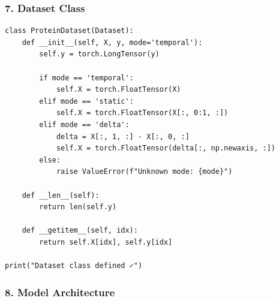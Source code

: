 \subsubsection*{7. Dataset Class}
 
\begin{lstlisting}
class ProteinDataset(Dataset):
    def __init__(self, X, y, mode='temporal'):
        self.y = torch.LongTensor(y)
 
        if mode == 'temporal':
            self.X = torch.FloatTensor(X)
        elif mode == 'static':
            self.X = torch.FloatTensor(X[:, 0:1, :])
        elif mode == 'delta':
            delta = X[:, 1, :] - X[:, 0, :]
            self.X = torch.FloatTensor(delta[:, np.newaxis, :])
        else:
            raise ValueError(f"Unknown mode: {mode}")
 
    def __len__(self):
        return len(self.y)
 
    def __getitem__(self, idx):
        return self.X[idx], self.y[idx]
 
print("Dataset class defined ✓")
\end{lstlisting}
 
\subsubsection*{8. Model Architecture}
 
